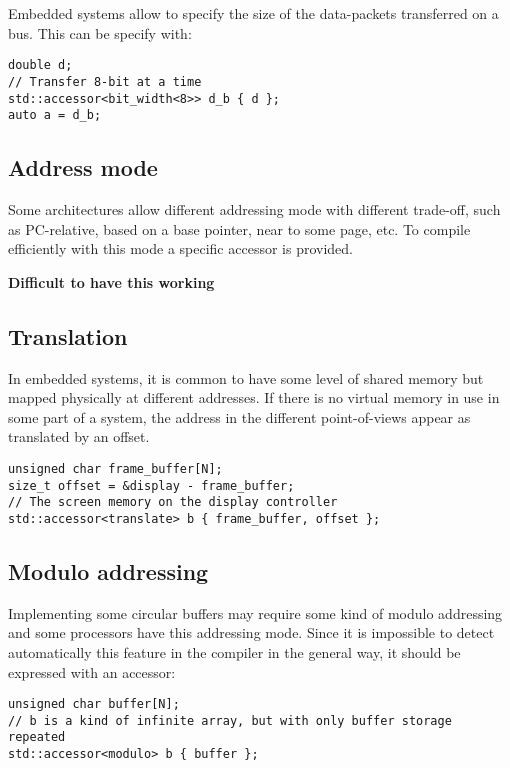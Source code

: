 \documentclass[a4paper]{article}
\begin{document}
Embedded systems allow to specify the size of the data-packets
transferred on a bus. This can be specify with:
\begin{lstlisting}
double d;
// Transfer 8-bit at a time
std::accessor<bit_width<8>> d_b { d };
auto a = d_b;
\end{lstlisting}


\subsection{Address mode}
\label{sec:address-mode}

Some architectures allow different addressing mode with different
trade-off, such as PC-relative, based on a base pointer, near to some
page, etc. To compile efficiently with this mode a specific accessor
is provided.

\textbf{Difficult to have this working}


\subsection{Translation}
\label{sec:translation}

In embedded systems, it is common to have some level of shared memory
but mapped physically at different addresses. If there is no virtual
memory in use in some part of a system, the address in the different
point-of-views appear as translated by an offset.
\begin{lstlisting}
unsigned char frame_buffer[N];
size_t offset = &display - frame_buffer;
// The screen memory on the display controller
std::accessor<translate> b { frame_buffer, offset };
\end{lstlisting}


\subsection{Modulo addressing}
\label{sec:modulo-addressing}

Implementing some circular buffers may require some kind of modulo
addressing and some processors have this addressing mode. Since it is
impossible to detect automatically this feature in the compiler in the
general way, it should be expressed with an accessor:
\begin{lstlisting}
unsigned char buffer[N];
// b is a kind of infinite array, but with only buffer storage repeated
std::accessor<modulo> b { buffer };
\end{lstlisting}
\end{document}
